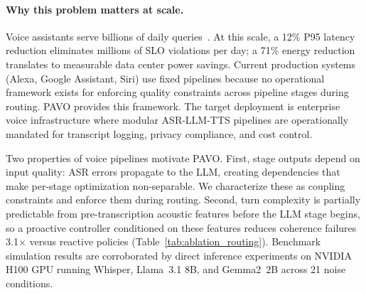 \documentclass{article}
\begin{document}
\paragraph{Why this problem matters at scale.} Voice assistants serve billions of daily queries~\citep{openai2024gpt4o}. At this scale, a 12\% P95 latency reduction eliminates millions of SLO violations per day; a 71\% energy reduction translates to measurable data center power savings. Current production systems (Alexa, Google Assistant, Siri) use fixed pipelines because no operational framework exists for enforcing quality constraints across pipeline stages during routing. PAVO provides this framework. The target deployment is enterprise voice infrastructure where modular ASR-LLM-TTS pipelines are operationally mandated for transcript logging, privacy compliance, and cost control.

Two properties of voice pipelines motivate PAVO. First, stage outputs depend on input quality: ASR errors propagate to the LLM, creating dependencies that make per-stage optimization non-separable. We characterize these as coupling constraints and enforce them during routing. Second, turn complexity is partially predictable from pre-transcription acoustic features before the LLM stage begins, so a proactive controller conditioned on these features reduces coherence failures 3.1$\times$ versus reactive policies (Table~\ref{tab:ablation_routing}). Benchmark simulation results are corroborated by direct inference experiments on NVIDIA H100 GPU running Whisper, Llama~3.1 8B, and Gemma2~2B across 21 noise conditions.
\end{document}
